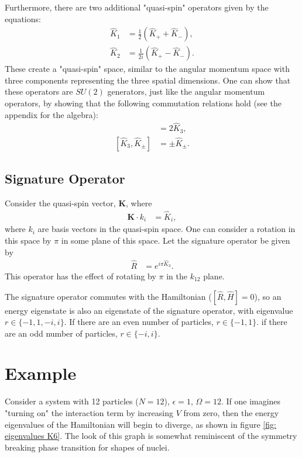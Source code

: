 \documentclass[
a4paper,
10pt,
twoside,
]{article}
\begin{document}
Furthermore, there are two additional "quasi-spin" operators given by the equations:
\begin{align}
	\hat{K}_1 &= \frac{1}{2}(\hat{K}_+ + \hat{K}_-),\\
	\hat{K}_2 &= \frac{1}{2i}(\hat{K}_+ - \hat{K}_-).
\end{align}
These create a "quasi-spin" space, similar to the angular momentum space with three components representing the three spatial dimensions.
One can show that these operators are $SU(2)$ generators, just like the angular momentum operators, by showing that the following commutation relations hold (see the appendix for the algebra):
\begin{align}
	[\hat{K}_+,\hat{K}_-] &= 2\hat{K}_3,\\
	[\hat{K}_3,\hat{K}_\pm] &= \pm\hat{K}_\pm.
\end{align}

\subsection{Signature Operator}\label{ssec: qs-sig}


Consider the quasi-spin vector, $\bm{K}$, where
\begin{align}
	\bm{K}\cdot k_i &= \hat{K}_i,
\end{align}
where $k_i$ are basis vectors in the quasi-spin space.
One can consider a rotation in this space by $\pi$ in some plane of this space.
Let the signature operator be given by
\begin{align}
	\hat{R} &= e^{i\pi\hat{K}_3}.
\end{align}
This operator has the effect of rotating by $\pi$ in the $k_{12}$ plane.

The signature operator commutes with the Hamiltonian ($[\hat{R},\hat{H}] = 0$), so an energy eigenstate is also an eigenstate of the signature operator, with eigenvalue $r \in \{-1,1,-i,i\}$.
If there are an even number of particles, $r\in\{-1,1\}$.
if there are an odd number of particles, $r\in\{-i,i\}$.


\section{Example}\label{sec: example}

Consider a system with 12 particles ($N=12$), $\epsilon = 1$, $\Omega = 12$.
If one imagines "turning on" the interaction term by increasing $V$ from zero, then the energy eigenvalues of the Hamiltonian will begin to diverge, as shown in figure \ref{fig: eigenvalues K6}.
The look of this graph is somewhat reminiscent of the symmetry breaking phase transition for shapes of nuclei.
\end{document}
